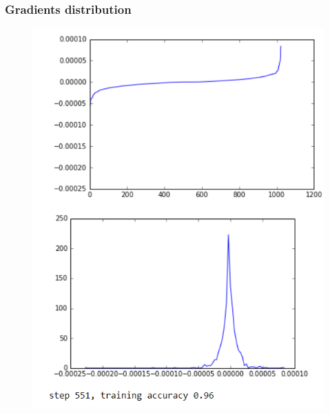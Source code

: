 \begin{frame}

    \frametitle{Gradients distribution}
    \begin{figure}
		\includegraphics[scale=0.28]{figure/551-2.PNG}
    \end{figure}
\end{frame}
